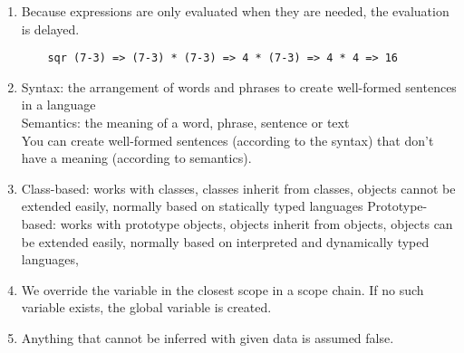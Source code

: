 \begin{enumerate}
\item Because expressions are only evaluated when they are needed, the evaluation is delayed.
\begin{verbatim}
    sqr (7-3) => (7-3) * (7-3) => 4 * (7-3) => 4 * 4 => 16
\end{verbatim}

\item Syntax: the arrangement of words and phrases to create well-formed sentences in a language \\
Semantics: the meaning of a word, phrase, sentence or text\\
You can create well-formed sentences (according to the syntax) that don't have a meaning (according to semantics).

\item Class-based: works with classes, classes inherit from classes, objects cannot be extended easily, normally based on statically typed languages
Prototype-based: works with prototype objects, objects inherit from objects, objects can be extended easily, normally based on interpreted and dynamically typed languages, 

\item We override the variable in the closest scope in a scope chain. If no such variable exists, the global variable is created.

\item Anything that cannot be inferred with given data is assumed false.


\end{enumerate}

